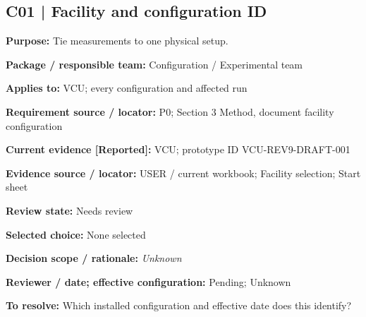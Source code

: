 \documentclass[11pt]{article}
\begin{document}
\par\noindent\begin{minipage}{\textwidth}\small\setlength{\parskip}{2pt}
\subsection*{C01 | Facility and configuration ID}
\textbf{Purpose:} Tie measurements to one physical setup.\par
\textbf{Package / responsible team:} Configuration / Experimental team\par
\textbf{Applies to:} VCU; every configuration and affected run\par
\textbf{Requirement source / locator:} P0; Section 3 Method, document facility configuration\par
\textbf{Current evidence [Reported]:} VCU; prototype ID VCU-REV9-DRAFT-001\par
\textbf{Evidence source / locator:} USER / current workbook; Facility selection; Start sheet\par
\textbf{Review state:} Needs review\par
\textbf{Selected choice:} None selected\par
\textbf{Decision scope / rationale:} \textit{Unknown}\par
\textbf{Reviewer / date; effective configuration:} Pending; Unknown\par
\textbf{To resolve:} Which installed configuration and effective date does this identify?\par
\end{minipage}\par\vspace{5pt}
\end{document}
